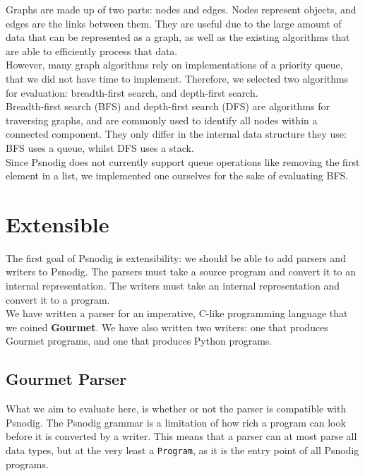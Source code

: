 Graphs are made up of two parts: nodes and edges. Nodes represent objects, and edges are the links between them. They are useful due to the large amount of data that can be represented as a graph, as well as the existing algorithms that are able to efficiently process that data. \\

However, many graph algorithms rely on implementations of a priority queue, that we did not have time to implement. Therefore, we selected two algorithms for evaluation: breadth-first search, and depth-first search. \\

Breadth-first search (BFS) and depth-first search (DFS) are algorithms for traversing graphs, and are commonly used to identify all nodes within a connected component. They only differ in the internal data structure they use: BFS uses a queue, whilst DFS uses a stack. \\

Since Psnodig does not currently support queue operations like removing the first element in a list, we implemented one ourselves for the sake of evaluating BFS.

\section{Extensible}

The first goal of Psnodig is extensibility: we should be able to add parsers and writers to Psnodig. The parsers must take a source program and convert it to an internal representation. The writers must take an internal representation and convert it to a program. \\

We have written a parser for an imperative, C-like programming language that we coined \textbf{Gourmet}. We have also written two writers: one that produces Gourmet programs, and one that produces Python programs.

\subsection{Gourmet Parser}

What we aim to evaluate here, is whether or not the parser is compatible with Psnodig. The Psnodig grammar is a limitation of how rich a program can look before it is converted by a writer. This means that a parser can at most parse all data types, but at the very least a \texttt{Program}, as it is the entry point of all Psnodig programs. \\

